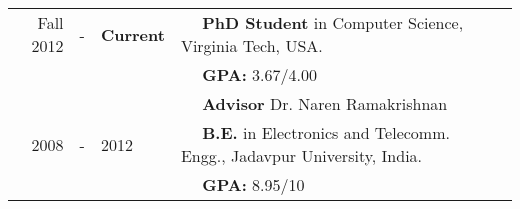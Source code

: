 
  \tabcolsep=0.11cm
  \begin{tabular}{rclll}
    Fall 2012 & - &{\bf Current} & $\quad$ {\bf PhD Student} in Computer Science, Virginia Tech, USA. \\
                & & & $\quad$ \textbf{GPA:} 3.67/4.00\\
                & & & $\quad$ \textbf{Advisor} Dr. Naren Ramakrishnan \\
    2008 & - & 2012 & $\quad$ {\bf B.E.} in Electronics and Telecomm. Engg., Jadavpur University, India. \\
        & & & $\quad$ \textbf{GPA:} 8.95/10\\
  \end{tabular}

